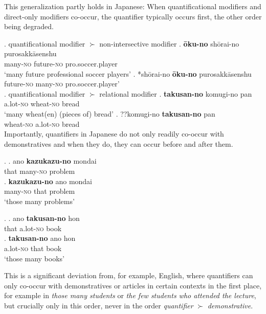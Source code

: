 This generalization partly holds in Japanese: When quantificational modifiers and direct-only modifiers co-occur, the quantifier typically occurs first, the other order being degraded.

\ex. quantificational modifier $\succ$ non-intersective modifier
\ag. \textbf{ōku-no} shōrai-no purosakkāsenshu\\
many-\textsc{no} future-\textsc{no} pro.soccer.player\\
`many future professional soccer players’
\bg. *shōrai-no \textbf{ōku-no} purosakkāsenshu\\
future-\textsc{no} many-\textsc{no} pro.soccer.player'\\

\ex. quantificational modifier $\succ$ relational modifier
\ag. \textbf{takusan-no} komugi-no pan\\
a.lot-\textsc{no} wheat-\textsc{no} bread\\
`many wheat(en) (pieces of) bread’ \label{takusankomugi}
\bg. ??komugi-no \textbf{takusan-no} pan\\
wheat-\textsc{no} a.lot-\textsc{no} bread\\

Importantly, quantifiers in Japanese do not only readily co-occur with demonstratives and when they do, they can occur before and after them.

\newpage

\ex. \ag. ano \textbf{kazukazu-no} mondai\\
that many-\textsc{no} problem\\
\bg. \textbf{kazukazu-no} ano mondai\\
many-\textsc{no} that problem\\
`those many problems’

\ex. \ag. ano \textbf{takusan-no} hon\\
that a.lot-\textsc{no} book\\
\bg. \textbf{takusan-no} ano hon\\
a.lot-\textsc{no} that book\\
`those many books’

This is a significant deviation from, for example,  English, where quantifiers can only co-occur with demonstratives or articles in certain contexts in the first place, for example in \textit{those many students} or \textit{the few students who attended the lecture}, but crucially only in this order, never in the order \textit{quantifier} $\succ$ \textit{demonstrative}.

